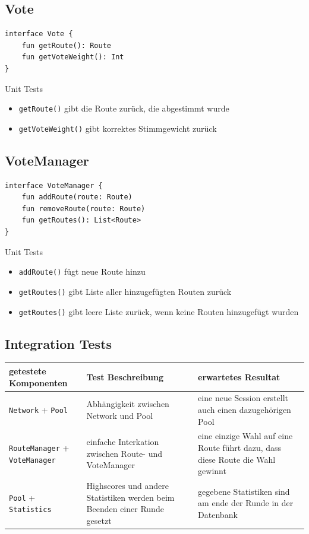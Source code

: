 \documentclass[11pt,a4paper,headsepline,footsepline,bibliography=totocnumbered]{article}
\begin{document}
\subsection{Vote} 
\begin{verbatim}
interface Vote {
    fun getRoute(): Route
    fun getVoteWeight(): Int
}
\end{verbatim}
Unit Tests
\begin{itemize}
	\item \texttt{getRoute()} gibt die Route zurück, die abgestimmt wurde
	\item \texttt{getVoteWeight()} gibt korrektes Stimmgewicht zurück
\end{itemize}

\subsection{VoteManager} 
\begin{verbatim}
interface VoteManager {
    fun addRoute(route: Route)
    fun removeRoute(route: Route)
    fun getRoutes(): List<Route>
}
\end{verbatim}
Unit Tests
\begin{itemize}
	\item \texttt{addRoute()} fügt neue Route hinzu
	\item \texttt{getRoutes()} gibt Liste aller hinzugefügten Routen zurück
	\item \texttt{getRoutes()} gibt leere Liste zurück, wenn keine Routen hinzugefügt wurden
\end{itemize}

\newpage

\subsection{Integration Tests}
\begin{table}[h]
\centering
\begin{tabular}{|p{5cm}|p{5cm}|p{5cm}|}
\hline
getestete Komponenten & Test Beschreibung & erwartetes Resultat \\
\hline
\texttt{Network} + \texttt{Pool} & Abhängigkeit zwischen Network und Pool & eine neue Session erstellt auch einen dazugehörigen Pool \\
\hline
\texttt{RouteManager} + \texttt{VoteManager} & einfache Interkation zwischen Route- und VoteManager & eine einzige Wahl auf eine Route führt dazu, dass diese Route die Wahl gewinnt \\
\hline
\texttt{Pool} + \texttt{Statistics} & Highscores und andere Statistiken werden beim Beenden einer Runde gesetzt & gegebene Statistiken sind am ende der Runde in der Datenbank \\
\hline

\end{tabular}
\end{table}
\end{document}
